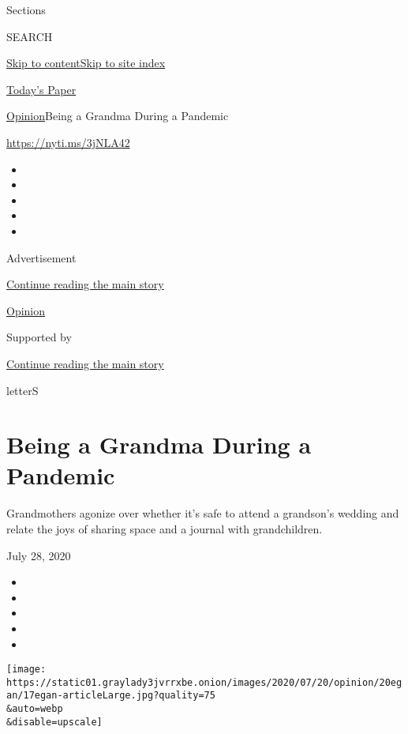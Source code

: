 Sections

SEARCH

\protect\hyperlink{site-content}{Skip to
content}\protect\hyperlink{site-index}{Skip to site index}

\href{https://myaccount.nytimes3xbfgragh.onion/auth/login?response_type=cookie\&client_id=vi}{}

\href{https://www.nytimes3xbfgragh.onion/section/todayspaper}{Today's
Paper}

\href{/section/opinion}{Opinion}\textbar{}Being a Grandma During a
Pandemic

\url{https://nyti.ms/3jNLA42}

\begin{itemize}
\item
\item
\item
\item
\item
\end{itemize}

Advertisement

\protect\hyperlink{after-top}{Continue reading the main story}

\href{/section/opinion}{Opinion}

Supported by

\protect\hyperlink{after-sponsor}{Continue reading the main story}

letterS

\hypertarget{being-a-grandma-during-a-pandemic}{%
\section{Being a Grandma During a
Pandemic}\label{being-a-grandma-during-a-pandemic}}

Grandmothers agonize over whether it's safe to attend a grandson's
wedding and relate the joys of sharing space and a journal with
grandchildren.

July 28, 2020

\begin{itemize}
\item
\item
\item
\item
\item
\end{itemize}

\texttt{[image: https://static01.graylady3jvrrxbe.onion/images/2020/07/20/opinion/20egan/17egan-articleLarge.jpg?quality=75\\\&auto=webp\\\&disable=upscale]}

